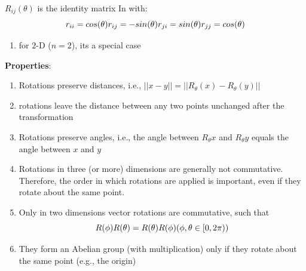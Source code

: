 $R_{ij}(\theta )$ is the identity matrix In with:
\[
    \hfill
    r_{ii} = cos(\theta )
    \hfill
    r_{ij} = -sin(\theta )
    \hfill
    r_{ji} = sin(\theta )
    \hfill
    r_{jj} = cos(\theta )
    \hfill
\]


\begin{enumerate}
    \item for $2$-D ($n=2$), its a special case
\end{enumerate}

\noindent
\textbf{Properties}:
\begin{enumerate}
    \item Rotations preserve distances, i.e., $||x-y|| = ||R_\theta (x) - R_\theta (y)||$

    \item rotations leave the distance between any two points unchanged after the transformation

    \item Rotations preserve angles, i.e., the angle between $R_\theta x$ and $R_\theta y$ equals the angle between $x$ and $y$

    \item Rotations in three (or more) dimensions are generally not commutative. Therefore, the order in which rotations are applied is important, even if they rotate about the same point. 

    \item Only in two dimensions vector rotations are commutative, such that 
    \[
        R(\phi)R(\theta ) = R(\theta )R(\phi)
        \hfill
        (\phi, \theta  \in [0, 2\pi))
    \]

    \item They form an Abelian group (with multiplication) only if they rotate about the same point (e.g., the origin)

\end{enumerate}





